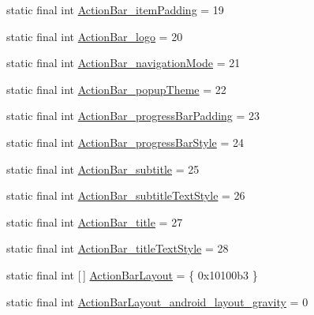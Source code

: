 \begin{DoxyCompactItemize}
\item 
static final int \mbox{\hyperlink{classcom_1_1synnapps_1_1carouselview_1_1_r_1_1styleable_a697bab4dd7dfa5f7841e34c7ab91da0f}{Action\+Bar\+\_\+item\+Padding}} = 19
\item 
static final int \mbox{\hyperlink{classcom_1_1synnapps_1_1carouselview_1_1_r_1_1styleable_a7725e655b86e69516e07b0bf0222e8e4}{Action\+Bar\+\_\+logo}} = 20
\item 
static final int \mbox{\hyperlink{classcom_1_1synnapps_1_1carouselview_1_1_r_1_1styleable_a3825bff5e5b9d8ca29f2d4bff67f7ee5}{Action\+Bar\+\_\+navigation\+Mode}} = 21
\item 
static final int \mbox{\hyperlink{classcom_1_1synnapps_1_1carouselview_1_1_r_1_1styleable_a219fdde74bd3e13745bd00394152cbff}{Action\+Bar\+\_\+popup\+Theme}} = 22
\item 
static final int \mbox{\hyperlink{classcom_1_1synnapps_1_1carouselview_1_1_r_1_1styleable_a145a0d3e0fb1f8d2ca96463bc1201074}{Action\+Bar\+\_\+progress\+Bar\+Padding}} = 23
\item 
static final int \mbox{\hyperlink{classcom_1_1synnapps_1_1carouselview_1_1_r_1_1styleable_ab3904eb40f5e138991e59820a9a06393}{Action\+Bar\+\_\+progress\+Bar\+Style}} = 24
\item 
static final int \mbox{\hyperlink{classcom_1_1synnapps_1_1carouselview_1_1_r_1_1styleable_af4c06578d07a6ba4f76202ebb7432d8d}{Action\+Bar\+\_\+subtitle}} = 25
\item 
static final int \mbox{\hyperlink{classcom_1_1synnapps_1_1carouselview_1_1_r_1_1styleable_aadbce280b6037fd2fc2e09301092cbe3}{Action\+Bar\+\_\+subtitle\+Text\+Style}} = 26
\item 
static final int \mbox{\hyperlink{classcom_1_1synnapps_1_1carouselview_1_1_r_1_1styleable_a6491720a30d324a5cba2a357538f2bd2}{Action\+Bar\+\_\+title}} = 27
\item 
static final int \mbox{\hyperlink{classcom_1_1synnapps_1_1carouselview_1_1_r_1_1styleable_a02138b0affaf01cf49acc08d7711a227}{Action\+Bar\+\_\+title\+Text\+Style}} = 28
\item 
static final int \mbox{[}$\,$\mbox{]} \mbox{\hyperlink{classcom_1_1synnapps_1_1carouselview_1_1_r_1_1styleable_a07373126e6364fd0810a17e68e256297}{Action\+Bar\+Layout}} = \{ 0x10100b3 \}
\item 
static final int \mbox{\hyperlink{classcom_1_1synnapps_1_1carouselview_1_1_r_1_1styleable_af9aca6284e8a83afa399cd5148b77faf}{Action\+Bar\+Layout\+\_\+android\+\_\+layout\+\_\+gravity}} = 0
\item 

\end{DoxyCompactItemize}
